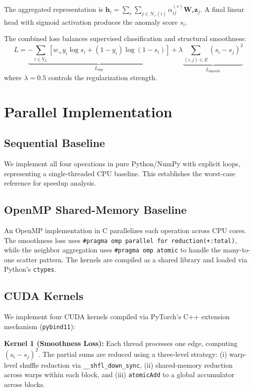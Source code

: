 \documentclass[conference]{IEEEtran}
\begin{document}
The aggregated representation is $\mathbf{h}_i = \sum_{r}\sum_{j \in \mathcal{N}_r(i)} \alpha_{ij}^{(r)} \mathbf{W}_r \mathbf{z}_j$. A final linear head with sigmoid activation produces the anomaly score $s_i$.

The combined loss balances supervised classification and structural smoothness:
\begin{equation}
L = \underbrace{-\sum_{i \in V_L} \left[w_+ y_i \log s_i + (1-y_i)\log(1-s_i)\right]}_{L_{\text{sup}}} + \lambda \underbrace{\sum_{(i,j)\in E}(s_i - s_j)^2}_{L_{\text{smooth}}}
\label{eq:total_loss}
\end{equation}
where $\lambda = 0.5$ controls the regularization strength.

\section{Parallel Implementation}
\subsection{Sequential Baseline}
We implement all four operations in pure Python/NumPy with explicit loops, representing a single-threaded CPU baseline. This establishes the worst-case reference for speedup analysis.

\subsection{OpenMP Shared-Memory Baseline}
An OpenMP implementation in C parallelizes each operation across CPU cores. The smoothness loss uses \texttt{\#pragma omp parallel for reduction(+:total)}, while the neighbor aggregation uses \texttt{\#pragma omp atomic} to handle the many-to-one scatter pattern. The kernels are compiled as a shared library and loaded via Python's \texttt{ctypes}.

\subsection{CUDA Kernels}
We implement four CUDA kernels compiled via PyTorch's C++ extension mechanism (\texttt{pybind11}):

\textbf{Kernel 1 (Smoothness Loss):} Each thread processes one edge, computing $(s_i - s_j)^2$. The partial sums are reduced using a three-level strategy: (i) warp-level shuffle reduction via \texttt{\_\_shfl\_down\_sync}, (ii) shared-memory reduction across warps within each block, and (iii) \texttt{atomicAdd} to a global accumulator across blocks.
\end{document}

